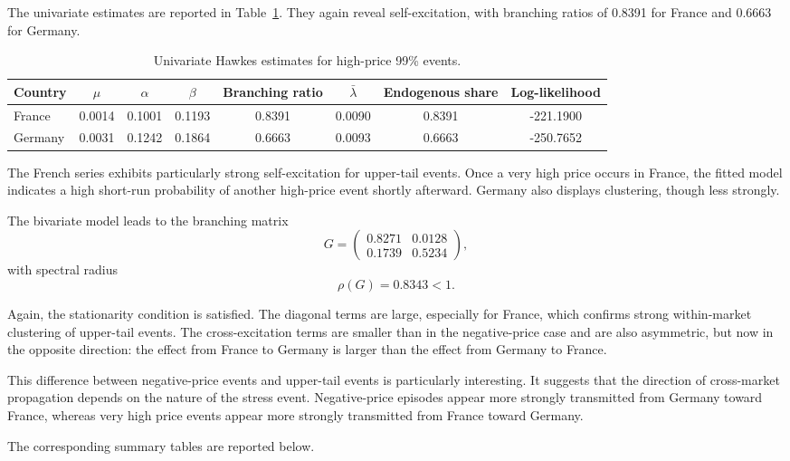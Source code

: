 The univariate estimates are reported in Table~\ref{tab:hawkes_uni_high}. They again reveal self-excitation, with branching ratios of 0.8391 for France and 0.6663 for Germany.

\begin{table}[H]
\centering
\caption{Univariate Hawkes estimates for high-price 99\% events.}
\label{tab:hawkes_uni_high}
\begin{tabular}{lccccccc}
\toprule
Country & \(\mu\) & \(\alpha\) & \(\beta\) & Branching ratio & \(\bar{\lambda}\) & Endogenous share & Log-likelihood \\
\midrule
France   & 0.0014 & 0.1001 & 0.1193 & 0.8391 & 0.0090 & 0.8391 & -221.1900 \\
Germany  & 0.0031 & 0.1242 & 0.1864 & 0.6663 & 0.0093 & 0.6663 & -250.7652 \\
\bottomrule
\end{tabular}
\end{table}

The French series exhibits particularly strong self-excitation for upper-tail events. Once a very high price occurs in France, the fitted model indicates a high short-run probability of another high-price event shortly afterward. Germany also displays clustering, though less strongly.

The bivariate model leads to the branching matrix
\[
G =
\begin{pmatrix}
0.8271 & 0.0128 \\
0.1739 & 0.5234
\end{pmatrix},
\]
with spectral radius
\[
\rho(G) = 0.8343 < 1.
\]

Again, the stationarity condition is satisfied. The diagonal terms are large, especially for France, which confirms strong within-market clustering of upper-tail events. The cross-excitation terms are smaller than in the negative-price case and are also asymmetric, but now in the opposite direction: the effect from France to Germany is larger than the effect from Germany to France.

This difference between negative-price events and upper-tail events is particularly interesting. It suggests that the direction of cross-market propagation depends on the nature of the stress event. Negative-price episodes appear more strongly transmitted from Germany toward France, whereas very high price events appear more strongly transmitted from France toward Germany.

The corresponding summary tables are reported below.


